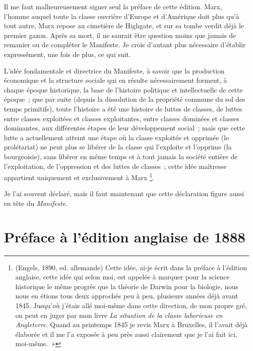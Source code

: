 \documentclass[french,twoside]{book} %
\newcommand{\byline}[1]{\bigskip{\RaggedLeft{#1}\par}\bigskip}
\begin{document}
\noindent Il me faut malheureusement signer seul la préface de cette édition. Marx, l’homme auquel toute la classe ouvrière d’Europe et d’Amérique doit plus qu’à tout autre, Marx repose au cimetière de Highgate, et sur sa tombe verdit déjà le premier gazon. Après sa mort, il ne saurait être question moins que jamais de remanier ou de compléter le Manifeste. Je crois d’autant plus nécessaire d’établir expressément, une fois de plus, ce qui suit.\par
L'idée fondamentale et directrice du Manifeste, à savoir que la production économique et la structure sociale qui en résulte nécessairement forment, à chaque époque historique, la base de l’histoire politique et intellectuelle de cette époque ; que par suite (depuis la dissolution de la propriété commune du sol des temps primitifs), toute l’histoire a été une histoire de luttes de classes, de luttes entre classes exploitées et classes exploitantes, entre classes dominées et classes dominantes, aux différentes étapes de leur développement social ; mais que cette lutte a actuellement atteint une étape où la classe exploitée et opprimée (le prolétariat) ne peut plus se libérer de la classe qui l’exploite et l’opprime (la bourgeoisie), sans libérer en même temps et à tout jamais la société entière de l’exploitation, de l’oppression et des luttes de classes ; cette idée maîtresse appartient uniquement et exclusivement à Marx \footnote{ \noindent (Engels, 1890, ed. allemande) Cette idée, ai-je écrit dans la préface à l’édition anglaise, cette idée qui selon moi, est appelée à marquer pour la science historique le même progrès que la théorie de Darwin pour la biologie, nous nous en étions tous deux approchés peu à peu, plusieurs années déjà avant 1845. Jusqu’où j’étais allé moi-même dans cette direction, de mon propre gré, on peut en juger par mon livre \emph{La situation de la classe laborieuse en Angleterre}. Quand au printemps 1845 je revis Marx à Bruxelles, il l’avait déjà élaborée et il me l’a exposée à peu près aussi clairement que je l’ai fait ici, moi-même. »
 }.\par
Je l’ai souvent déclaré, mais il faut maintenant que cette déclaration figure aussi en tête du \emph{Manifeste}.\par

\byline{Friedrich Engels ; \\
Londres, 28 juin 1883}

\section[{Préface à l’édition anglaise de 1888}]{Préface à l’édition anglaise de 1888}
\end{document}
